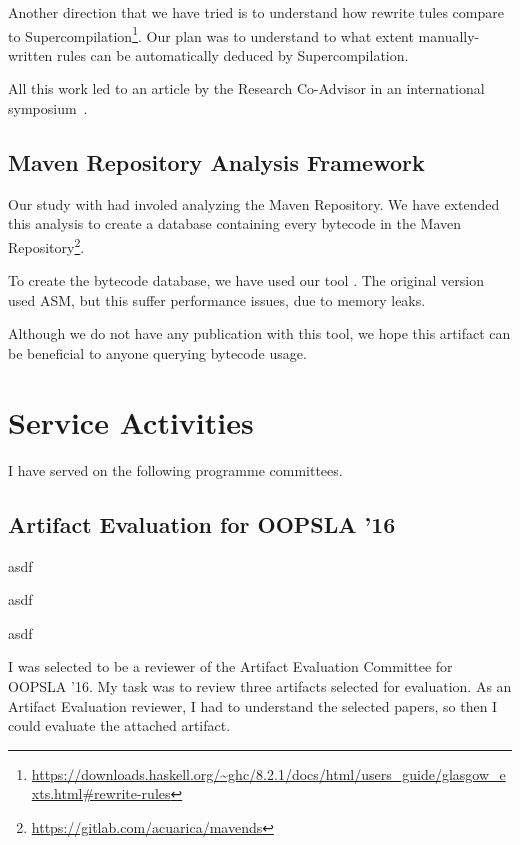 Another direction that we have tried is to understand how rewrite tules compare to Supercompilation\footnote{\url{https://downloads.haskell.org/~ghc/8.2.1/docs/html/users_guide/glasgow_exts.html\#rewrite-rules}}.
Our plan was to understand to what extent manually-written rules can be automatically deduced by Supercompilation.

All this work led to an article by the Research Co-Advisor in an international symposium~\cite{Nystrom:2017:SFS:3136000.3136011}.

\subsection*{Maven Repository Analysis Framework}

Our study with \smu{} had involed analyzing the Maven Repository.
We have extended this analysis to create a database containing every bytecode in the Maven Repository\footnote{\url{https://gitlab.com/acuarica/mavends}}.

To create the bytecode database, we have used our tool \jnif{}.
The original version used ASM, but this suffer performance issues, due to memory leaks. 

Although we do not have any publication with this tool, we hope this artifact can be beneficial to anyone querying bytecode usage.

\section{Service Activities}

I have served on the following programme committees.

\subsection*{Artifact Evaluation for OOPSLA '16}

asdf

asdf

asdf

I was selected to be a reviewer of the Artifact Evaluation Committee for OOPSLA '16.
My task was to review three artifacts selected for evaluation.
As an Artifact Evaluation reviewer, I had to understand the selected papers, so
then I could evaluate the attached artifact.

